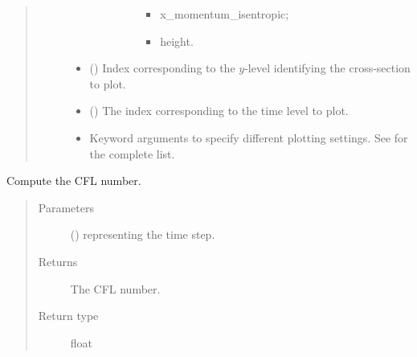 \documentclass[letterpaper,10pt,english]{sphinxmanual}
\begin{document}
\begin{fulllineitems}
\begin{fulllineitems}
\begin{quote}
\begin{description}
\begin{itemize}
\begin{itemize}
\begin{description}
\begin{itemize}
\item {} 
x\_momentum\_isentropic;

\item {} 
height.

\end{itemize}

\end{description}

\end{itemize}


\item {} 
 () \textendash{} Index corresponding to the \(y\)-level identifying the cross-section to plot.

\item {} 
 () \textendash{} The index corresponding to the time level to plot.

\item {} 
 \textendash{} Keyword arguments to specify different plotting settings.
See {\hyperref[\detokenize{api:utils.utils_plot.contour_xz}]{}} for the complete list.

\end{itemize}

\end{description}\end{quote}

\end{fulllineitems}


\begin{fulllineitems}
\label{\detokenize{api:storages.state_isentropic.StateIsentropic.get_cfl}}
Compute the CFL number.
\begin{quote}\begin{description}
\item[{Parameters}] \leavevmode
{} () \textendash{}  representing the time step.

\item[{Returns}] \leavevmode
The CFL number.

\item[{Return type}] \leavevmode
float


\end{description}
\end{quote}
\end{fulllineitems}
\end{fulllineitems}
\end{document}
